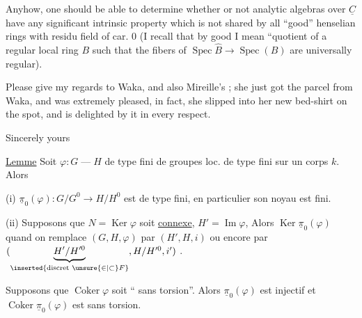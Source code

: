 Anyhow, one should be able to determine whether or not  analytic algebras over $\underline{C}$ have any significant intrinsic property which is not shared by all ``good'' henselian rings with residu field of car. 0 (I recall that by good I mean ``quotient of a regular local ring $B$ such that the fibers of $\operatorname{Spec}\widehat{B}\rightarrow\operatorname{Spec}(B)$ are universally regular).

Please give my regards to Waka, and also Mireille's ; she just got the parcel from Waka, and was extremely pleased, in fact, she slipped into her new bed-shirt on the spot, and is delighted by it in every respect.

Sincerely yours




\uline{Lemme} Soit $\varphi:G\mathbin{\text{---}}H$  de type fini de groupes loc. de type fini sur un corps $k$. Alors

(i) $\underline{\pi}_0(\varphi):G/G^0\longrightarrow H/H^0$ est de type fini, en particulier son noyau est fini.


\deleted{[Si $N=\operatorname{Ker}\varphi$ est connexe, alors $\underline{\pi}_0(\varphi)$ est $\unsure{\simeq}$ une immersion fermée]}

(ii) Supposons que $N=\operatorname{Ker}\varphi$ soit \uline{connexe},  $H'=\operatorname{Im}\varphi$,  Alors $\operatorname{Ker}\underline{\pi}_0(\varphi)$
quand on remplace $(G,H,\varphi)$ par $(H',H,i)$ ou encore par $(\underbrace{H'/H'^0}_{\inserted{\text{discret }\unsure{\in|\subset}F}},H/H'^0,i')$ \unsure{\ldots}.

  Supposons  que $\operatorname{Coker}\varphi$ soit `` sans torsion''. Alors $\underline{\pi}_0(\varphi)$ est injectif et $\operatorname{Coker}\underline{\pi}_0(\varphi)$ est sans torsion.

